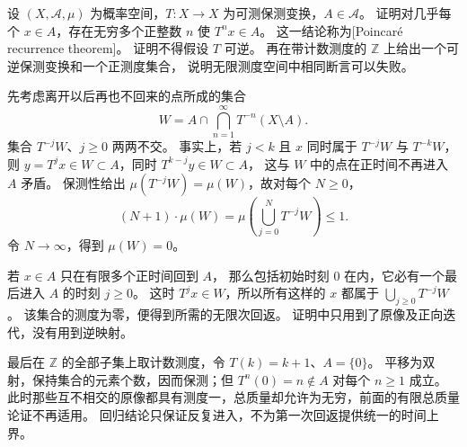 \begin{exercise}[Poincaré 回归]\label{b1:ex:32-poincare-recurrence}
设 \((X,\mathcal A,\mu)\) 为概率空间，\(T:X\to X\) 为可测保测变换，\(A\in\mathcal A\)。
证明对几乎每个 \(x\in A\)，存在无穷多个正整数 \(n\) 使 \(T^nx\in A\)。
这一结论称为[Poincaré recurrence theorem]。
证明不得假设 \(T\) 可逆。
再在带计数测度的 \(\mathbb Z\) 上给出一个可逆保测变换和一个正测度集合，
说明无限测度空间中相同断言可以失败。
\end{exercise}
\begin{solution}
先考虑离开以后再也不回来的点所成的集合
\[
 W=A\cap\bigcap_{n=1}^\infty T^{-n}(X\setminus A).
\]
集合 \(T^{-j}W\)、\(j\geq0\) 两两不交。
事实上，若 \(j<k\) 且 \(x\) 同时属于 \(T^{-j}W\) 与 \(T^{-k}W\)，
则 \(y=T^jx\in W\subset A\)，同时 \(T^{k-j}y\in W\subset A\)，
这与 \(W\) 中的点在正时间不再进入 \(A\) 矛盾。
保测性给出 \(\mu(T^{-j}W)=\mu(W)\)，故对每个 \(N\geq0\)，
\[
 (N+1)\cdot\mu(W)
 =\mu\left(\bigcup_{j=0}^NT^{-j}W\right)\leq1.
\]
令 \(N\to\infty\)，得到 \(\mu(W)=0\)。

若 \(x\in A\) 只在有限多个正时间回到 \(A\)，
那么包括初始时刻 \(0\) 在内，它必有一个最后进入 \(A\) 的时刻 \(j\geq0\)。
这时 \(T^jx\in W\)，所以所有这样的 \(x\) 都属于
\(\bigcup_{j\geq0}T^{-j}W\)。
该集合的测度为零，便得到所需的无限次回返。
证明中只用到了原像及正向迭代，没有用到逆映射。

最后在 \(\mathbb Z\) 的全部子集上取计数测度，令 \(T(k)=k+1\)、\(A=\{0\}\)。
平移为双射，保持集合的元素个数，因而保测；但 \(T^n(0)=n\notin A\) 对每个 \(n\geq1\) 成立。
此时那些互不相交的原像都具有测度一，总质量却允许为无穷，前面的有限总质量论证不再适用。
回归结论只保证反复进入，不为第一次回返提供统一的时间上界。
\end{solution}

